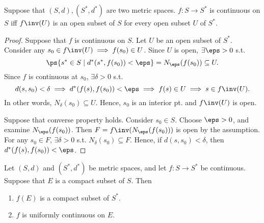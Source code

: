 \documentclass[11pt]{scrartcl}
\numberwithin{equation}{section}
\begin{document}
\begin{theorem}
    Suppose that $(S,d), (S^*, d^*)$ are two metric spaces.
    $f: S\to S^*$ is continuous on $S$ iff 
    $f\inv(U)$ is an open subset of $S$ for every open subset $U$ 
    of $S^*$.
\end{theorem}

\begin{proof}
    Suppose that $f$ is continuous on $S$. Let $U$ be an open 
    subset of $S^*$. Consider any $s_0 \in f\inv(U) \implies 
    f(s_0)\in U$. Since $U$ is open, $\exists \eps>0$ s.t. 
    \[
        \ps{s^*\in S\mid d^*(s^*, f(s_0))<\eps} = N_\eps(f(s_0)) 
        \subseteq U.
    \]
    Since $f$ is continuous at $s_0$, $\exists \delta>0$ s.t. 
    \[
        d(s,s_0) < \delta \implies d^*(f(s),f(s_0)) < \eps \implies f(s) \in U \implies s\in f\inv(U).
    \]
    In other words, $N_\delta(s_0) \subseteq U$. Hence, $s_0$ is 
    an interior pt. and $f\inv(U)$ is open.

    Suppose that converse property holds. 
    Consider $s_0\in S$. Choose $\eps>0$, and examine
    $N_\eps(f(s_0))$. Then $F = f\inv(N_\eps(f(s_0)))$ is open 
    by the assumption. For any $s_0\in F$, $\exists \delta>0$ s.t. 
    $N_\delta(s_0) \subseteq F$. Hence, if $d(s,s_0) < \delta$, then 
    $d^*(f(s),f(s_0)) < \eps$.
\end{proof}

\begin{theorem}
    Let $(S,d)$ and $(S^*,d^*)$ be metric spaces, and let 
    $f : S \rightarrow S^*$ be continuous. Suppose that $E$ is a 
    compact subset of $S$. Then 
    \begin{enumerate}
        \item $f(E)$ is a compact subset of $S^*$.
        \item $f$ is uniformly continuous on $E$.
    \end{enumerate}
\end{theorem}
\end{document}
